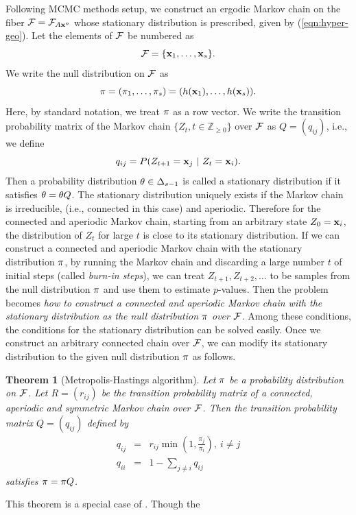 \documentclass[12pt]{article}
\newtheorem{Theorem}{Theorem}[section]
\theoremstyle{definition}
\def\Bx{{\bf x}}
\def\Btheta{{\bf \theta}}
\def\Bpi{{\bf \pi}}
\begin{document}
Following MCMC methods setup, we construct an ergodic Markov chain 
on the fiber ${\cal F} = {\cal F}_{A\Bx^o}$ whose 
stationary distribution is prescribed, given by (\ref{eqn:hyper-geo}). 
Let
the elements of ${\cal F}$ be numbered as 
\[
 {\cal F} =
\{\Bx_1,\ldots,\Bx_s\}.
\]
We write the null distribution on ${\cal F}$ as
\[
 \Bpi = (\pi_1,\ldots,\pi_s) = (h(\Bx_1),\ldots,h(\Bx_s)).
\]
Here, by standard notation, we treat
$\Bpi$ as a row vector. We write the transition probability matrix of
the Markov chain $\{Z_t, t \in \mathbb{Z}_{\geq 0}\}$ over ${\cal F}$ as
$Q = (q_{ij})$, i.e., we define
\[
 q_{ij} = P(Z_{t+1} = \Bx_j\ |\ Z_t = \Bx_i).
\]
Then a probability distribution $\Btheta \in \Delta_{s-1}$
is called a stationary distribution if it satisfies $\Btheta =
\Btheta Q$. The stationary distribution uniquely exists if the Markov chain
is irreducible, (i.e., connected in this case) and aperiodic. Therefore
for the connected and aperiodic Markov chain, starting from an arbitrary
state $Z_0 = \Bx_i$, the distribution of $Z_t$ for large $t$ is close to
its stationary distribution. If we can construct a connected and aperiodic
Markov chain with the stationary distribution $\Bpi$, by
running the Markov chain and discarding a large number $t$ of initial
steps (called {\it burn-in steps}), we can treat $Z_{t+1}, Z_{t+2},
\ldots$ to be samples from the null distribution $\Bpi$ and use
them to estimate $p$-values. Then the problem becomes {\it how to
construct a connected and aperiodic Markov chain with the stationary
distribution as the null distribution $\Bpi$ over ${\cal F}$}. Among
these conditions, the conditions for the stationary distribution can be
solved easily. Once we construct an arbitrary connected chain over
${\cal F}$, we can modify its stationary distribution to the given null
distribution $\Bpi$ as follows.
\begin{Theorem}[Metropolis-Hastings algorithm]
\label{thm:M-H-algo}
Let $\Bpi$ be a probability distribution on ${\cal F}$. Let $R =
 (r_{ij})$ be the transition probability matrix of a connected,
 aperiodic and symmetric Markov chain over ${\cal F}$. Then the
transition probability matrix $Q = (q_{ij})$ defined by
\[
\begin{array}{rcl}
 q_{ij} & = & r_{ij}\min\displaystyle\left(1,
				      \frac{\pi_j}{\pi_i}\right),\ i\neq
 j\\
q_{ii} & = & 1 - \displaystyle\sum_{j \neq i}q_{ij}
\end{array}
\]
satisfies $\Bpi = \Bpi Q$.
\end{Theorem}
This theorem is a special case of \cite{Hastings-1970}. Though the
\end{document}
